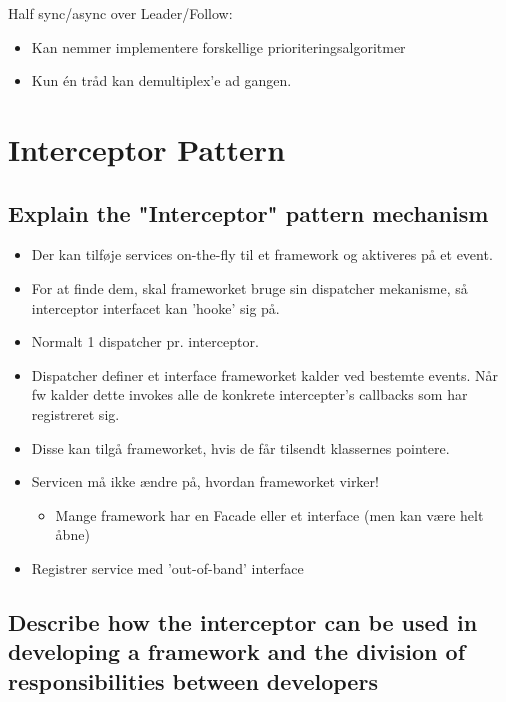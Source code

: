 \documentclass{article}
\begin{document}
Half sync/async over Leader/Follow:
\vspace{-10pt}
\begin{itemize}
	\item Kan nemmer implementere forskellige prioriteringsalgoritmer
	\item Kun én tråd kan demultiplex'e ad gangen.
\end{itemize}





\newpage
\section{Interceptor Pattern}

\subsection{Explain the "Interceptor" pattern mechanism}
\begin{itemize}
	\item Der kan tilføje services on-the-fly til et framework og aktiveres på et event.
	\item For at finde dem, skal frameworket bruge sin dispatcher mekanisme, så interceptor interfacet kan 'hooke' sig på.
	\item Normalt 1 dispatcher pr. interceptor.
	\item Dispatcher definer et interface frameworket kalder ved bestemte events. 
	Når fw kalder dette invokes alle de konkrete intercepter's callbacks som har registreret sig.
	\item Disse kan tilgå frameworket, hvis de får tilsendt klassernes pointere.
	\item Servicen må ikke ændre på, hvordan frameworket virker!
	\begin{itemize}
		\item Mange framework har en Facade eller et interface (men kan være helt åbne)
	\end{itemize}
	\item Registrer service med 'out-of-band' interface
\end{itemize}


\subsection{Describe how the interceptor can be used in developing a framework and the division of responsibilities between developers}
\end{document}
